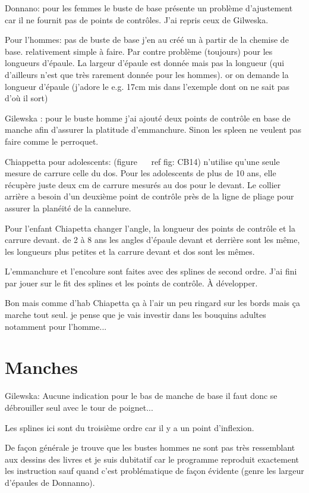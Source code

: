 \documentclass[10pt,a4paper,twoside]{report}
\begin{document}
Donnano:  pour les femmes le buste de base présente un problème d'ajustement car il ne
fournit pas de points de contrôles. J'ai repris ceux de Gilweska.

Pour l'hommes: pas de buste de base j'en au  créé un à partir de la chemise de base.
relativement simple à faire. Par contre problème (toujours) pour les
longueurs d'épaule. La largeur d'épaule est donnée mais pas la
longueur (qui d'ailleurs n'est que très rarement donnée pour les
hommes). or on demande la longueur d'épaule (j'adore le e.g. 17cm mis
dans l'exemple dont on ne sait pas d'où il sort)

Gilewska : pour le buste homme j'ai ajouté  deux points de contrôle
en base de manche  afin d'assurer la platitude d'emmanchure. Sinon les
spleen ne veulent pas faire comme le perroquet.


Chiappetta pour adolescents: (figure ~ \ ref {fig: CB14}) n'utilise qu'une seule mesure de carrure celle du dos. Pour les adolescents de plus de 10 ans, elle récupère juste deux cm de carrure mesurés au dos pour le devant. Le collier arrière a besoin d'un deuxième point de contrôle près de la ligne de pliage pour assurer la planéité de la cannelure.

Pour l'enfant Chiapetta changer l'angle, la longueur des points de contrôle et la carrure devant. de 2 à 8 ans les angles d'épaule devant et derrière sont les même, les longueurs plus petites et la carrure devant et dos sont les mêmes.

L'emmanchure et l'encolure sont faites avec des splines de second ordre. J'ai fini par jouer sur le fit des splines et les points de contrôle. À développer.

Bon mais comme d'hab Chiapetta ça à l'air un peu ringard sur les bords mais ça marche tout seul. je pense que je vais investir dans
les bouquins adultes notamment pour l'homme...


\section{Manches}
Gilewska: Aucune indication pour le bas de manche de base il faut donc
se débrouiller seul avec le tour de poignet...

Les splines ici sont du troisième ordre car il y a un point d'inflexion.


De façon générale je trouve que les bustes hommes ne sont pas très ressemblant aux dessins des livres et je suis dubitatif car le programme reproduit exactement les instruction sauf quand c'est problématique de façon évidente (genre les largeur d'épaules de Donnanno).
\end{document}
